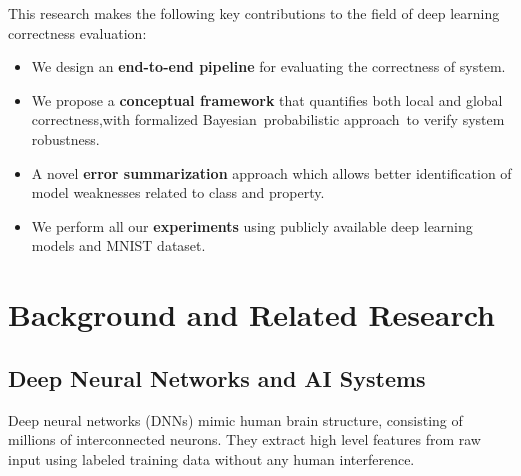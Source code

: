 \documentclass[10pt, conference, a4paper, final]{IEEEtran}
\begin{document}
This research makes the following key contributions to the field of deep learning correctness evaluation:
\begin{itemize}
   
    \item We design an \textbf{end-to-end pipeline} for evaluating the correctness of system.
    
    \item We propose a \textbf{conceptual framework} that quantifies both local  and global correctness,with formalized Bayesian probabilistic approach to verify system robustness.
    \item A novel \textbf{error summarization}  approach which allows better identification of model weaknesses related to class and property.

    \item We perform all our \textbf{experiments} using publicly available deep learning models and MNIST dataset.
\end{itemize}



\section{Background and Related Research}

\subsection{Deep Neural Networks and AI Systems}

Deep neural networks (DNNs) mimic human brain structure, consisting of  millions of interconnected neurons. They extract high level features from raw input using labeled training data without any human interference.
\end{document}
